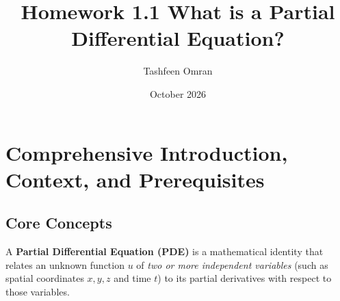 \documentclass[11pt,a4paper]{article}
\title{Homework 1.1 What is a Partial Differential Equation?}
\author{Tashfeen Omran}
\date{October 2026}
\begin{document}
\maketitle
\tableofcontents
\newpage

\section{Comprehensive Introduction, Context, and Prerequisites}

\subsection{Core Concepts}
A \textbf{Partial Differential Equation (PDE)} is a mathematical identity that relates an unknown function $u$ of \emph{two or more independent variables} (such as spatial coordinates $x, y, z$ and time $t$) to its partial derivatives with respect to those variables. 
\end{document}
